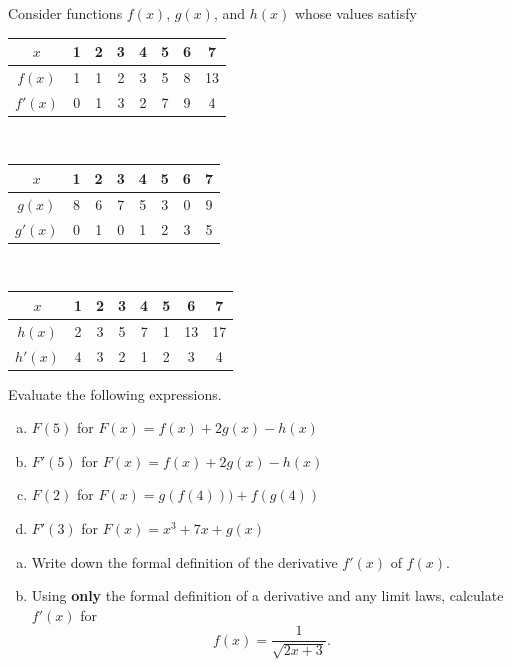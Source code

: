 \documentclass[11pt]{exam}
\theoremstyle{definition}
\begin{document}
\begin{questions}
\newpage
\question[10]\mbox{}
Consider functions $f(x)$, $g(x)$, and $h(x)$ whose values satisfy
\begin{center}
\begin{tabular}{c|c|c|c|c|c|c|c}
$x$ & 1 & 2 & 3 & 4 & 5 & 6 & 7\\\hline
$f(x)$ & 1 & 1 & 2 & 3 & 5 & 8 & 13\\\hline
$f'(x)$ & 0 & 1 & 3 & 2 & 7 & 9 & 4\\\hline
\end{tabular}\\
\vspace{0.3in}
\begin{tabular}{c|c|c|c|c|c|c|c}
$x$ & 1 & 2 & 3 & 4 & 5 & 6 & 7\\\hline
$g(x)$ & 8 & 6 & 7 & 5 & 3 & 0 & 9\\\hline
$g'(x)$ & 0 & 1 & 0 & 1 & 2 & 3 & 5
\end{tabular}\\
\vspace{0.3in}
\begin{tabular}{c|c|c|c|c|c|c|c}
$x$ & 1 & 2 & 3 & 4 & 5 & 6 & 7\\\hline
$h(x)$ & 2 & 3 & 5 & 7 & 1 & 13 & 17\\\hline
$h'(x)$ & 4 & 3 & 2 & 1 & 2 & 3 & 4
\end{tabular}
\end{center}
Evaluate the following expressions.
\begin{enumerate}[(a)]
\item $F(5)$ for $F(x) = f(x) + 2g(x) - h(x)$
\vspace{1in}
\item $F'(5)$ for $F(x) = f(x) + 2g(x) - h(x)$
\vspace{1in}
\item $F(2)$ for $F(x) = g(f(4))) + f(g(4))$
\vspace{1in}
\item $F'(3)$ for $F(x) = x^3 + 7x + g(x)$
\end{enumerate}
\newpage
\question[10]\mbox{}
\begin{enumerate}[(a)]
\item Write down the formal definition of the derivative $f'(x)$ of $f(x)$.
\vspace{2in}
\item Using \textbf{only} the formal definition of a derivative and any limit laws, calculate $f'(x)$ for
$$f(x) = \frac{1}{\sqrt{2x+3}}.$$
\end{enumerate}
\end{questions}
\end{document}

